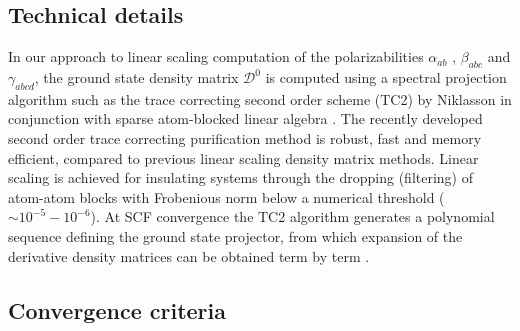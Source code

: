 \documentclass[prl,aps,twocolumn,showpacs,twocolumngrid,superbib]{revtex4}
\begin{document}
\subsection{Technical details}

In our approach to linear scaling computation of the polarizabilities 
$\alpha_{ab}$ \cite{Weber04}, $\beta_{abc}$ and $\gamma_{abcd}$, the ground state
density matrix $\mathcal{D}^0$ is computed using a spectral projection algorithm such
as the trace correcting second order scheme (TC2) by Niklasson \cite{ANiklasson02A} in 
conjunction with sparse atom-blocked linear algebra \cite{ANiklasson03,MChallacombe00B}.
The recently developed second order trace correcting purification method is robust,
fast and memory efficient, compared to previous linear scaling density matrix methods.  
Linear scaling is achieved for insulating systems through the dropping (filtering) of atom-atom 
blocks with Frobenious norm below a numerical threshold ($\sim 10^{-5}-10^{-6}$).
At SCF convergence the TC2 algorithm generates a polynomial sequence 
defining the ground state projector, from which expansion of the derivative 
density matrices can be obtained term by term \cite{ANiklasson04}.

\subsection{Convergence criteria}
\end{document}
